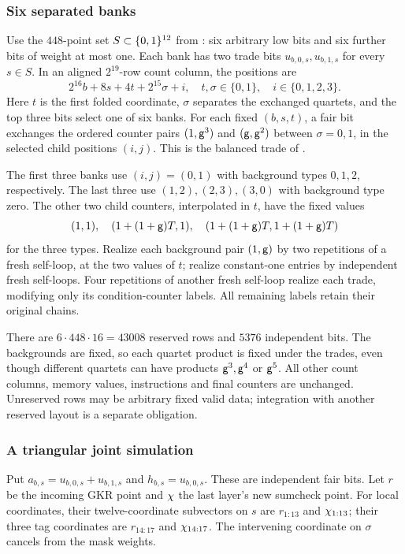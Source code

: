 \subsubsection{Six separated banks}

Use the $448$-point set $S\subset\{0,1\}^{12}$ from : six arbitrary low bits and six further bits of weight at most one. Each bank has two trade bits $u_{b,0,s},u_{b,1,s}$ for every $s\in S$. In an aligned $2^{19}$-row count column, the positions are
\[
 2^{16}b+8s+4t+2^{15}\sigma+i,
 \quad t,\sigma\in\{0,1\},\quad i\in\{0,1,2,3\}.
\]
Here $t$ is the first folded coordinate, $\sigma$ separates the exchanged quartets, and the top three bits select one of six banks. For each fixed $(b,s,t)$, a fair bit exchanges the ordered counter pairs $(1,\mathsf{g}^3)$ and $(\mathsf{g},\mathsf{g}^2)$ between $\sigma=0,1$, in the selected child positions $(i,j)$. This is the balanced trade of .

The first three banks use $(i,j)=(0,1)$ with background types $0,1,2$, respectively. The last three use $(1,2),(2,3),(3,0)$ with background type zero. The other two child counters, interpolated in $t$, have the fixed values
\[
 (1,1),\quad (1+(1+\mathsf{g})T,1),\quad
 (1+(1+\mathsf{g})T,1+(1+\mathsf{g})T)
\]
for the three types. Realize each background pair $(1,\mathsf{g})$ by two repetitions of a fresh self-loop, at the two values of $t$; realize constant-one entries by independent fresh self-loops. Four repetitions of another fresh self-loop realize each trade, modifying only its condition-counter labels. All remaining labels retain their original chains.

There are $6\cdot448\cdot16=43008$ reserved rows and $5376$ independent bits. The backgrounds are fixed, so each quartet product is fixed under the trades, even though different quartets can have products $\mathsf{g}^3,\mathsf{g}^4$ or $\mathsf{g}^5$. All other count columns, memory values, instructions and final counters are unchanged. Unreserved rows may be arbitrary fixed valid data; integration with another reserved layout is a separate obligation.

\subsubsection{A triangular joint simulation}

Put $a_{b,s}=u_{b,0,s}+u_{b,1,s}$ and $h_{b,s}=u_{b,0,s}$. These are independent fair bits. Let $r$ be the incoming GKR point and $\chi$ the last layer's new sumcheck point. For local coordinates, their twelve-coordinate subvectors on $s$ are $r_{1:13}$ and $\chi_{1:13}$; their three tag coordinates are $r_{14:17}$ and $\chi_{14:17}$. The intervening coordinate on $\sigma$ cancels from the mask weights.

